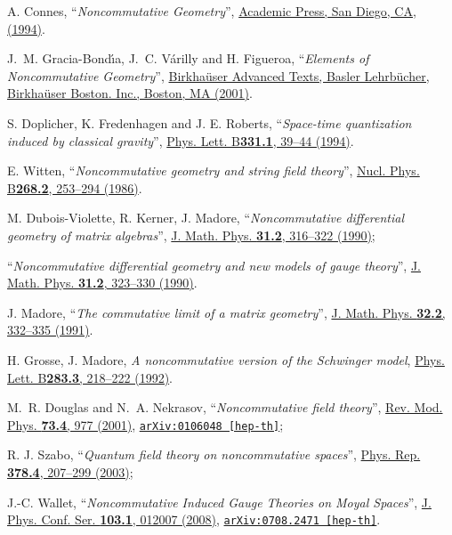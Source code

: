 \documentclass[a4paper,11pt,twoside]{article}
\numberwithin{equation}{section}
\theoremstyle{nonumberplain}
\newcounter{and}
\begin{document}
\begin{thebibliography}{88} 

%
A. Connes, %
``\emph{Noncommutative Geometry}'', %
\href{http://www.alainconnes.org/en/downloads.php}{Academic Press, San Diego, CA, (1994)}. %

%
J.~M. Gracia-Bond{\'\i}a, J.~C. V{\'a}rilly and H. Figueroa, %
``\emph{Elements of Noncommutative Geometry}'', %
\href{http://dx.doi.org/10.1007/978-1-4612-0005-5}{Birkha\"user Advanced Texts, Basler Lehrb\"ucher, Birkha\"user Boston. Inc., Boston, MA (2001)}.%

%
S. Doplicher, K. Fredenhagen and J. E. Roberts, %
``\emph{Space-time quantization induced by classical gravity}'', %
\href{http://dx.doi.org/10.1016/0370-2693(94)90940-7}{Phys. Lett. B\textbf{331.1}, 39--44 (1994)}.%

%
E. Witten, %
``\emph{Noncommutative geometry and string field theory}'', %
\href{http://dx.doi.org/10.1016/0550-3213(86)90155-0}{Nucl. Phys. B\textbf{268.2}, 253--294 (1986)}.%

M. Dubois-Violette, R. Kerner, J. Madore, %
``\emph{Noncommutative differential geometry of matrix algebras}'', %
\href{http://dx.doi.org/10.1063/1.528916}{J. Math. Phys. \textbf{31.2}, 316--322 (1990)};\par%
``\emph{Noncommutative differential geometry and new models of gauge theory}'', %
\href{http://dx.doi.org/10.1063/1.528917}{J. Math. Phys. \textbf{31.2}, 323--330 (1990)}.%

J. Madore, %
``\emph{The commutative limit of a matrix geometry}'', %
\href{http://dx.doi.org/10.1063/1.529418}{J. Math. Phys. \textbf{32.2}, 332--335 (1991)}.\par%
H. Grosse, J. Madore, %
\emph{A noncommutative version of the Schwinger model}, %
\href{http://dx.doi.org/10.1016/0370-2693(92)90011-R}{Phys. Lett. B\textbf{283.3}, 218--222 (1992)}.%

%
M.~R. Douglas and N.~A. Nekrasov, %
``\emph{Noncommutative field theory}'', %
\href{http://dx.doi.org/10.1103/RevModPhys.73.977}{Rev. Mod. Phys. \textbf{73.4}, 977 (2001)}, %
\href{http://arxiv.org/abs/hep-th/0106048}{\texttt{arXiv:0106048 [hep-th]}};\par%
R. J. Szabo, %
``\emph{Quantum field theory on noncommutative spaces}'', %
\href{http://dx.doi.org/10.1016/S0370-1573(03)00059-0}{Phys. Rep. \textbf{378.4}, 207--299 (2003)};\par%
J.-C. Wallet, %
``\emph{Noncommutative Induced Gauge Theories on Moyal Spaces}'', %
\href{http://dx.doi.org/10.1088/1742-6596/103/1/012007}{J. Phys. Conf. Ser. \textbf{103.1}, 012007 (2008)}, %
\href{http://arxiv.org/abs/arXiv:0708.2471}{\texttt{arXiv:0708.2471 [hep-th]}}.%


\end{thebibliography}
\end{document}

